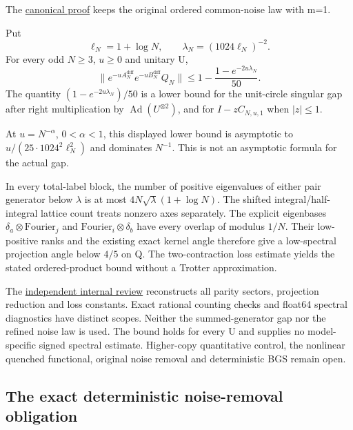 The \href{https://github.com/ChurilovMaksim/BGS/blob/main/mathematics/original_channel_gap.md}{canonical proof} keeps the original ordered common-noise law with m=1.

\begin{theorem}\label{pass2:frontier-fm-020}

Put
\[
\ell_N=1+\log N,\qquad \lambda_N=(1024\ell_N)^{-2}.
\]
For every odd \(N\ge3\), \(u\ge0\) and unitary U,
\[
\|e^{-uA_N^{\mathrm{diff}}}e^{-uB_N^{\mathrm{diff}}}Q_N\|
\le 1-\frac{1-e^{-2u\lambda_N}}{50}.
\]
The quantity \((1-e^{-2u\lambda_N})/50\) is a lower bound for the unit-circle singular gap after right multiplication by \(\operatorname{Ad}(U^{\otimes2})\), and for \(I-zC_{N,u,1}\) when \(|z|\le1\).

\end{theorem}

At \(u=N^{-\alpha}\), \(0<\alpha<1\), this displayed lower bound is asymptotic to \(u/(25\cdot1024^2\ell_N^2)\) and dominates \(N^{-1}\). This is not an asymptotic formula for the actual gap.

In every total-label block, the number of positive eigenvalues of either pair generator below \(\lambda\) is at most \(4N\sqrt\lambda(1+\log N)\). The shifted integral/half-integral lattice count treats nonzero axes separately. The explicit eigenbases \(\delta_a\otimes\mathrm{Fourier}_j\) and \(\mathrm{Fourier}_i\otimes\delta_b\) have every overlap of modulus \(1/N\). Their low-positive ranks and the existing exact kernel angle therefore give a low-spectral projection angle below \(4/5\) on Q. The two-contraction loss estimate yields the stated ordered-product bound without a Trotter approximation.

The \href{https://github.com/ChurilovMaksim/BGS/blob/main/archive/record/original_channel_gap_review_20261006.md}{independent internal review} reconstructs all parity sectors, projection reduction and loss constants. Exact rational counting checks and float64 spectral diagnostics have distinct scopes. Neither the summed-generator gap nor the refined noise law is used. The bound holds for every U and supplies no model-specific signed spectral estimate. Higher-copy quantitative control, the nonlinear quenched functional, original noise removal and deterministic BGS remain open.

\hypertarget{the-exact-deterministic-noise-removal-obligation}{%
\subsection{The exact deterministic noise-removal obligation}\label{the-exact-deterministic-noise-removal-obligation}}

